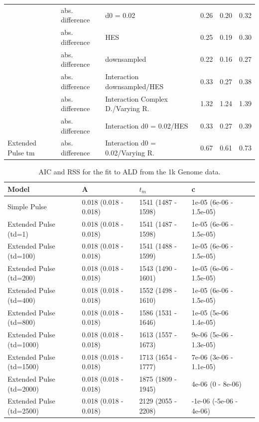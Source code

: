 \documentclass[11pt]{article}
\begin{document}
\begin{table}[H]
\begin{tabular}[t]{l|l|l|r|r|r}
 & abs. difference & d0 = 0.02 & 0.26 & 0.20 & 0.32\\

 & abs. difference & HES & 0.25 & 0.19 & 0.30\\

 & abs. difference & downsampled & 0.22 & 0.16 & 0.27\\

 & abs. difference & Interaction downsampled/HES & 0.33 & 0.27 & 0.38\\

 & abs. difference & Interaction Complex D./Varying R. & 1.32 & 1.24 & 1.39\\

 & abs. difference & Interaction d0 = 0.02/HES & 0.33 & 0.27 & 0.39\\

\multirow{-11}{*}{\raggedright\arraybackslash Extended Pulse tm} & abs. difference & Interaction d0 = 0.02/Varying R. & 0.67 & 0.61 & 0.73\\
\hline
\end{tabular}
\end{table}


\begin{table}[H]
\caption{\label{tab:tableSReadl_data_AIC_RSS} AIC and RSS for the fit  to ALD from the 1k Genome data.}
\centering
\begin{tabular}[t]{l|l|l|l|l}
\hline
Model & A & $t_m$ & c\\
\hline
Simple Pulse & 0.018 (0.018 - 0.018) & 1541 (1487 - 1598) & 1e-05 (6e-06 - 1.5e-05)\\
\hline
Extended Pulse (td=1) & 0.018 (0.018 - 0.018) & 1541 (1487 - 1598) & 1e-05 (6e-06 - 1.5e-05)\\
\hline
Extended Pulse (td=100) & 0.018 (0.018 - 0.018) & 1541 (1488 - 1599) & 1e-05 (6e-06 - 1.5e-05)\\
\hline
Extended Pulse (td=200) & 0.018 (0.018 - 0.018) & 1543 (1490 - 1601) & 1e-05 (6e-06 - 1.5e-05)\\
\hline
Extended Pulse (td=400) & 0.018 (0.018 - 0.018) & 1552 (1498 - 1610) & 1e-05 (6e-06 - 1.5e-05)\\
\hline
Extended Pulse (td=800) & 0.018 (0.018 - 0.018) & 1586 (1531 - 1646) & 1e-05 (5e-06 1.4e-05)\\
\hline
Extended Pulse (td=1000) & 0.018 (0.018 - 0.018) & 1613 (1557 - 1673) & 9e-06 (5e-06 - 1.3e-05)\\
\hline
Extended Pulse (td=1500) &  0.018 (0.018 - 0.018) & 1713 (1654 - 1777) & 7e-06 (3e-06 - 1.1e-05)\\
\hline
Extended Pulse (td=2000) & 0.018 (0.018 - 0.018) & 1875 (1809 - 1945) & 4e-06 (0 - 8e-06)\\
\hline
Extended Pulse (td=2500) & 0.018 (0.018 - 0.018) & 2129 (2055 - 2208) & -1e-06 (-5e-06 - 4e-06)\\
\hline
\end{tabular}
\end{table}
\end{document}
